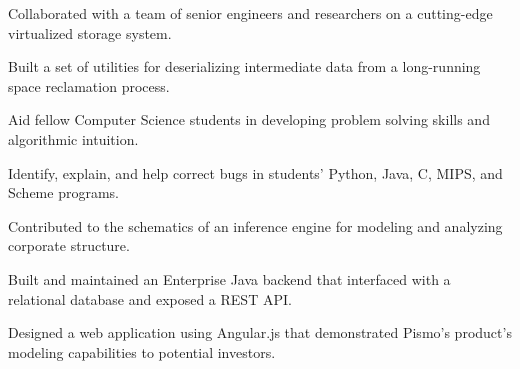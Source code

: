 \documentclass{resume}
\begin{document}
\begin{minipage}[t]{0.66\textwidth}
\begin{tightemize}
\item Collaborated with a team of senior engineers and researchers on a cutting-edge virtualized storage system.
\item Built a set of utilities for deserializing intermediate data from a long-running space reclamation process.
\end{tightemize}
\sectionsep

\begin{tightemize}
\item Aid fellow Computer Science students in developing problem solving skills and algorithmic intuition.
\item Identify, explain, and help correct bugs in students’ Python, Java, C, MIPS, and Scheme programs.
\end{tightemize}
\sectionsep

\begin{tightemize}
\item Contributed to the schematics of an inference engine for modeling and analyzing corporate structure.
\item Built and maintained an Enterprise Java backend that interfaced with a relational database and exposed a REST API.
\item Designed a web application using Angular.js that demonstrated Pismo's product's modeling capabilities to potential investors.
\end{tightemize}
\sectionsep




\end{minipage}
\end{document}

